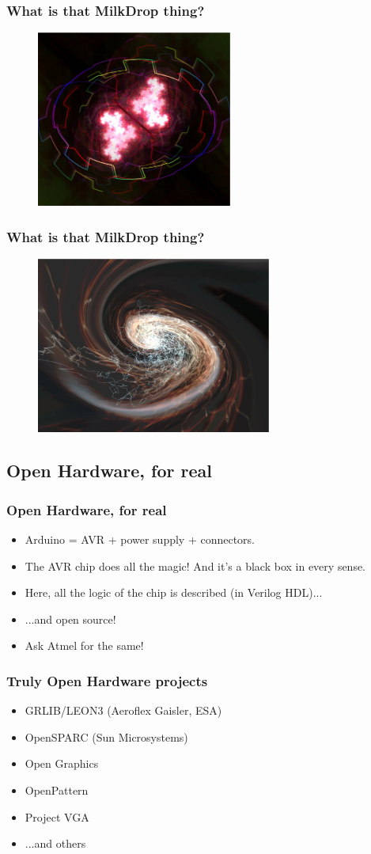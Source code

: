 \documentclass{beamer}
\begin{document}
\frame
{
  \frametitle{What is that MilkDrop thing?}
  \begin{figure}[H]
  \includegraphics[height=58mm]{milkdrop2.eps}
  \end{figure}
}

\frame
{
  \frametitle{What is that MilkDrop thing?}
  \begin{figure}[H]
  \includegraphics[height=58mm]{milkdrop3.eps}
  \end{figure}
}

\subsection{Open Hardware, for real}
\frame
{
  \frametitle{Open Hardware, for real}

  \begin{itemize}
  \item Arduino = AVR + power supply + connectors.
  \item The AVR chip does all the magic! And it's a black box in every sense.
  \item Here, all the logic of the chip is described (in Verilog HDL)...
  \item ...and open source!
  \item Ask Atmel for the same!
  \end{itemize}
}

\frame
{
  \frametitle{Truly Open Hardware projects}

  \begin{itemize}
  \item GRLIB/LEON3 (Aeroflex Gaisler, ESA)
  \item OpenSPARC (Sun Microsystems)
  \item Open Graphics
  \item OpenPattern
  \item Project VGA
  \item ...and others
  \end{itemize}
}
\end{document}
